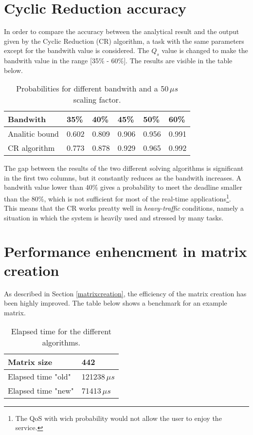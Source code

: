 \section{Cyclic Reduction accuracy} \label{craccuracy}
In order to compare the accuracy between the analytical result and the output given by the Cyclic Reduction (CR) algorithm, a task with the same parameters except for the bandwith value is considered. The \( Q_{s} \) value is changed to make the bandwith value in the range [35\% - 60\%]. The results are visible in the table below.
\begin{table}[H]
\label{comparison}
\begin{center}
\begin{tabular}{| l | l | l | l | l | l |}
  \hline
  Bandwith & 35\% & 40\% & 45\% & 50\% & 60\% \\ \hline
  Analitic bound & 0.602 & 0.809 & 0.906 & 0.956 & 0.991 \\
  CR algorithm & 0.773 & 0.878 & 0.929 & 0.965 & 0.992 \\ \hline
\end{tabular}
\caption[]{Probabilities for different bandwith and a 50\,\( \mu{s} \) scaling factor\footnotemark[3].}
\end{center} 
\end{table}

The gap between the results of the two different solving algorithms is significant in the first two columns, but it constantly reduces as the bandwith increases. A bandwith value lower than 40\% gives a probability to meet the deadline smaller than the 80\%, which is not sufficient for most of the real-time applications\footnote{The QoS with wich probability would not allow the user to enjoy the service.}.\\
This means that the CR works preatty well in \emph{heavy-traffic} conditions, namely a situation in which the system is heavily used and stressed by many tasks.

\section{Performance enhencment in matrix creation} \label{matrixperformance}
As described in Section \ref{matrixcreation}, the efficiency of the matrix creation has been highly improved. The table below shows a benchmark for an example matrix.
\begin{table}[H]
\label{benchmark}
\begin{center}
\begin{tabular}{| l | l |}
  \hline
  Matrix size & 442 \\ \hline
  Elapsed time "old" & 121238\( \,\mu{s} \) \\ \hline
  Elapsed time "new" & 71413\( \,\mu{s} \) \\ \hline
\end{tabular}
\caption[]{Elapsed time for the different algorithms\footnotemark.}
\end{center}
\end{table}

